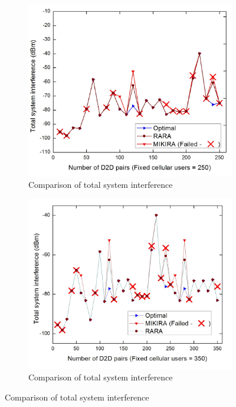 \documentclass{ieeeaccess}
\begin{document}
\begin{figure}
\begin{multicols}{2}
\begin{subfigure}{.86\linewidth}
 	\includegraphics[width=\linewidth]{Graph/inter_rara.jpg}\par
	\caption{Comparison of total system interference}
	\label{fig:inter_res}
	\end{subfigure}
	
	\hspace{12pt}
	\begin{subfigure}{.86\linewidth}
  	\includegraphics[width=\linewidth]{Graph/inter_rara_350.jpg}\par
	\caption{Comparison of total system interference}
	\label{fig:inter_res_350}
	\end{subfigure}
	\end{multicols}


\end{figure}
\end{document}
